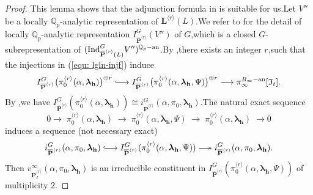 \documentclass[SecEq,CM,GP]{degruyter-crelle} %
\theoremstyle{plain}
\newcommand{\hooklongrightarrow}{\lhook\joinrel\longrightarrow}
\newcommand{\twoheadlongrightarrow}{\relbar\joinrel\twoheadrightarrow}
\newcommand{\ana}{{\rm an}}
\newcommand{\ind}{{\rm Ind}}
\newcommand{\lrr}{{\langle r\rangle}}
\newcommand{\op}{{\overline{{\mathbf{P}}}}}
\newcommand{\ra}{{\longrightarrow}}
\newcommand{\BQ}{{\mathbb{Q}}}
\newcommand{\bL}{{\mathbf{L}}}
\newcommand{\bh}{{\mathbf{h}}}
\newcommand{\FI}{{\mathfrak{I}}}
\begin{document}
\begin{proof}
This lemma shows that the adjunction formula in \cite{emerton2007jacquet} is suitable for us.\;Let $V''$ be a  locally $\BQ_p$-analytic representation of $\bL^{\lrr}(L)$.\;We refer to \cite{emerton2007jacquet} for the detail of locally $\BQ_p$-analytic representation $I_{\op^{\lrr}}^G(V'')$ of $G$,\;which is a closed $G$-subrepresentation of $(\ind_{\op^{\lrr}(L)}^{G} V'')^{\BQ_p-\ana}$.\;By \cite[Theorem 0.13]{emerton2007jacquet},\;there exists an integer $r$,\;such that the injections in (\ref{equ: lgln-injf}) induce
\begin{equation}\label{equ: lgln-keymap}
	I_{\op^{\lrr}}^G \big(\pi_0^{\lrr}(\alpha,{\bm\lambda}_\bh)\big)^{\oplus r} \hooklongrightarrow I_{\op^{\lrr}}^G \big(\pi_0^{\lrr}(\alpha,{\bm\lambda}_\bh,\Psi)\big)^{\oplus r} \longrightarrow \pi_{\infty}^{R_{\infty}-\ana}[\FI_t].
\end{equation}
By \cite[Proposition 2.8.10]{emerton2007jacquet},\;we have $I_{\op^{\lrr}}^G (\pi_0^{\lrr}(\alpha,{\bm\lambda}_\bh))\cong i_{\op^{\lrr}}^G(\alpha,\pi_0, {\bm\lambda}_\bh)$.\;The natural exact sequence $$0\ra \;\pi_0^{\lrr}(\alpha,{\bm\lambda}_\bh)\; \ra \;\pi_0^{\lrr}(\alpha,{\bm\lambda}_\bh,\Psi)\; \ra \;\pi_0^{\lrr}(\alpha,{\bm\lambda}_\bh)\; \ra 0$$ induces a sequence (not necessary exact)
\begin{equation*}
	i_{\op^{\lrr}}^G(\alpha,\pi_0, {\bm\lambda}_\bh) \hooklongrightarrow I_{\op^{\lrr}}^G(\pi_0^{\lrr}(\alpha,{\bm\lambda}_\bh,\Psi)) \twoheadlongrightarrow  i_{\op^{\lrr}}^G(\alpha,\pi_0, {\bm\lambda}_\bh).
\end{equation*}
Then $v_{\op^{\lrr}_I}^{\infty}(\alpha,\pi_0, {\bm\lambda}_\bh)$ is an irreducible constituent in $I_{\op^{\lrr}}^G(\pi_0^{\lrr}(\alpha,{\bm\lambda}_\bh,\Psi)) $ of multiplicity $2$.\;


\end{proof}
\end{document}
